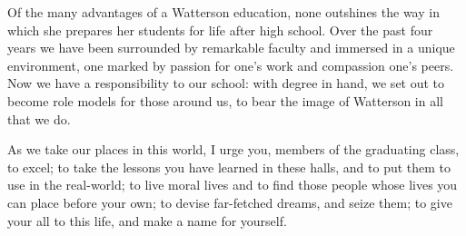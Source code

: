\documentclass{report}
\begin{document}
Of the many advantages of a Watterson education, none outshines the way in
which she prepares her students for life after high school. Over the past four
years we have been surrounded by remarkable faculty and immersed in a unique
environment, one marked by passion for one's work and compassion one's peers.
Now we have a responsibility to our school: with degree in hand, we set out to
become role models for those around us, to bear the image of Watterson in all
that we do.

As we take our places in this world, I urge you, members of the graduating
class, to excel; to take the lessons you have learned in these halls, and to
put them to use in the real-world; to live moral lives and to find those people
whose lives you can place before your own; to devise far-fetched dreams, and
seize them; to give your all to this life, and make a name for yourself.
\end{document}

